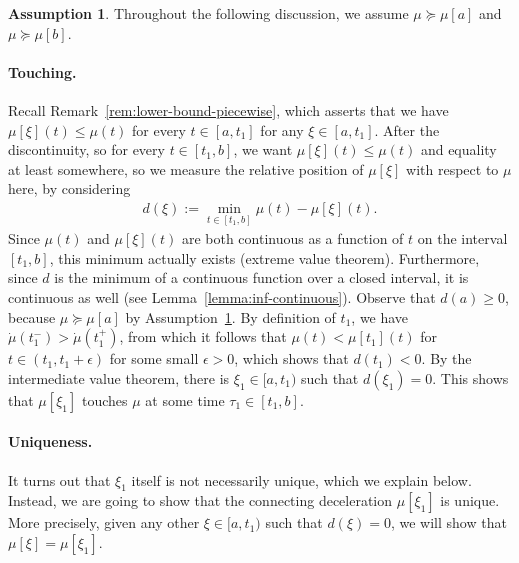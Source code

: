 \documentclass[a4paper]{report}
\theoremstyle{definition}
\newtheorem{assump}{Assumption}[chapter]
\theoremstyle{plain}
\newcommand\halfopen[2]{\ensuremath{[#1,#2)}}
\begin{document}
\begin{assump}\label{assump:smoothing}
  Throughout the following discussion, we assume $\mu \succeq \mu[a]$ and $\mu \succeq \mu[b]$.
\end{assump}



\paragraph{Touching.}
Recall Remark~\ref{rem:lower-bound-piecewise}, which asserts that we have
$\mu[\xi](t) \leq \mu(t)$ for every $t \in [a,t_{1}]$ for any $\xi \in [a, t_{1}]$.
%
After the discontinuity, so for every $t \in [t_{1}, b]$, we want
$\mu[\xi](t) \leq \mu(t)$ and equality at least somewhere, so we measure the relative
position of $\mu[\xi]$ with respect to $\mu$ here, by considering
\begin{align}
  d(\xi) := \min_{t \in [t_{1}, b]} \mu(t) - \mu[\xi](t) .
\end{align}
Since $\mu(t)$ and $\mu[\xi](t)$ are both continuous as a function of $t$ on the interval
$[t_{1}, b]$, this minimum actually exists (extreme value theorem).
%
Furthermore, since $d$ is the minimum of a continuous function over a closed
interval, it is continuous as well (see Lemma~\ref{lemma:inf-continuous}).
%
Observe that $d(a) \geq 0$, because $\mu \succeq \mu[a]$ by Assumption~\ref{assump:smoothing}.
%
By definition of $t_{1}$, we have $\dot{\mu}(t_{1}^{-}) > \dot{\mu}(t_{1}^{+})$,
from which it follows that $\mu(t) < \mu[t_{1}](t)$ for $ t\in (t_{1}, t_{1} + \epsilon)$ for some
small $\epsilon > 0$, which shows that $d(t_{1}) < 0$.
%
By the intermediate value theorem, there is $\xi_{1} \in \halfopen{a}{t_{1}}$ such
that $d(\xi_{1}) = 0$.
%
This shows that $\mu[\xi_{1}]$ touches $\mu$ at some time
$\tau_{1} \in [t_{1}, b]$.


\paragraph{Uniqueness.}
It turns out that $\xi_{1}$ itself is not necessarily unique, which we explain
below. Instead, we are going to show that the connecting deceleration
$\mu[\xi_{1}]$ is unique. More precisely, given any other $\xi \in \halfopen{a}{t_{1}}$ such
that $d(\xi) = 0$, we will show that $\mu[\xi] = \mu[\xi_{1}]$.
\end{document}
